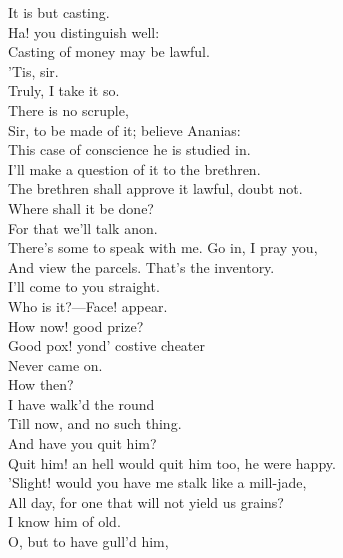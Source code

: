 \documentclass[a4paper,oneside]{memoir}
\begin{document}
\begin{drama*}
It is but casting.\\
\tribulationspeaks {} Ha! you distinguish well:\\
Casting of money may be lawful.\\
\ananiasspeaks {} 'Tis, sir.\\
\tribulationspeaks Truly, I take it so.\\
\subtlespeaks {} There is no scruple,\\
Sir, to be made of it; believe Ananias:\\
This case of conscience he is studied in.\\
\tribulationspeaks I'll make a question of it to the brethren.\\
\ananiasspeaks The brethren shall approve it lawful, doubt not.\\
Where shall it be done?\\
\subtlespeaks {} For that we'll talk anon.\\
There's some to speak with me. Go in, I pray you,\\
And view the parcels. That's the inventory.\\
I'll come to you straight.\\
 Who is it?---Face! appear.\\
How now! good prize?\\
\facespeaks {} Good pox! yond' costive cheater\\
Never came on.\\
\subtlespeaks {} How then?\\
\facespeaks {} I have walk'd the round\\
Till now, and no such thing.\\
\subtlespeaks {} And have you quit him?\\
\facespeaks Quit him! an hell would quit him too, he were happy.\\
'Slight! would you have me stalk like a mill-jade,\\
All day, for one that will not yield us grains?\\
I know him of old.\\
\subtlespeaks {} O, but to have gull'd him,\\

\end{drama*}
\end{document}
